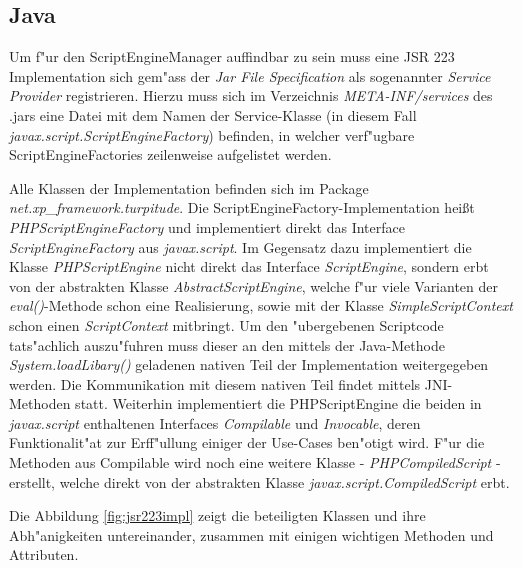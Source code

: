 \subsection{Java}
\label{sec:chap1:design:java}

Um f"ur den ScriptEngineManager auffindbar zu sein muss eine JSR 223 Implementation sich gem"ass der \emph{Jar File Specification} \cite{JARSPEC} 
als sogenannter \emph{Service Provider} registrieren. Hierzu muss sich im Verzeichnis \emph{META-INF/services} des .jars eine Datei
mit dem Namen der Service-Klasse (in diesem Fall \emph{javax.script.ScriptEngineFactory}) befinden, in welcher verf"ugbare 
ScriptEngineFactories zeilenweise aufgelistet werden.

Alle Klassen der Implementation befinden sich im Package \emph{net.xp\_framework.turpitude}. 
Die ScriptEngineFactory-Implementation hei\ss t \emph{PHPScriptEngineFactory} und implementiert direkt das Interface 
\emph{ScriptEngineFactory} aus \emph{javax.script}. Im Gegensatz dazu implementiert die Klasse \emph{PHPScriptEngine} nicht
direkt das Interface \emph{ScriptEngine}, sondern erbt von der abstrakten Klasse \emph{AbstractScriptEngine}, welche f"ur
viele Varianten der \emph{eval()}-Methode schon eine Realisierung, sowie mit der Klasse \emph{SimpleScriptContext} schon einen 
\emph{ScriptContext} mitbringt. Um den "ubergebenen Scriptcode tats"achlich auszu"fuhren muss dieser an den mittels der Java-Methode
\emph{System.loadLibary()} geladenen nativen Teil der Implementation weitergegeben werden. Die Kommunikation mit diesem
nativen Teil findet mittels JNI-Methoden statt.
Weiterhin implementiert die PHPScriptEngine die beiden in \emph{javax.script} enthaltenen Interfaces \emph{Compilable} und
\emph{Invocable}, deren Funktionalit"at zur Erff"ullung einiger der Use-Cases ben"otigt wird. F"ur die Methoden aus
Compilable wird noch eine weitere Klasse - \emph{PHPCompiledScript} - erstellt, welche direkt von der abstrakten
Klasse \emph{javax.script.CompiledScript} erbt.

Die Abbildung \ref{fig:jsr223impl} zeigt die beteiligten Klassen und ihre Abh"anigkeiten untereinander,
zusammen mit einigen wichtigen Methoden und Attributen. 

